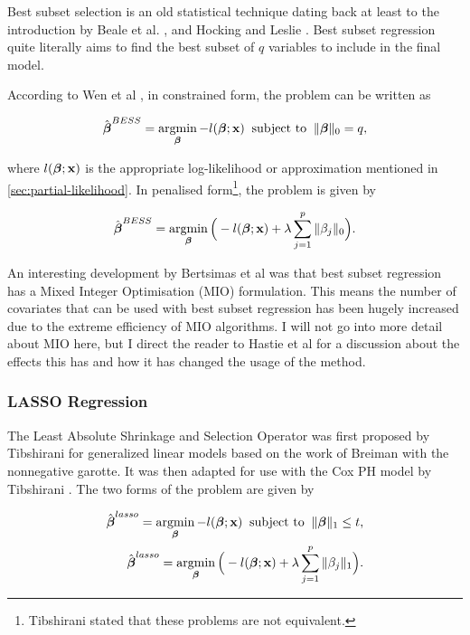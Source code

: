Best subset selection is an old statistical technique dating back at least to the introduction by Beale et al. , and Hocking and Leslie . Best subset regression quite literally aims to find the best subset of $q$ variables to include in the final model.

According to Wen et al , in constrained form, the problem can be written as

\begin{equation}
    \hat{\boldsymbol{\beta}}^{BESS}=\operatorname*{argmin}_{\boldsymbol{\beta}} -l(\boldsymbol{\beta};\textbf{x})\;\;\textrm{subject to}\;\;\Vert\boldsymbol{\beta}\Vert_0=q,
\end{equation}

where $l(\boldsymbol{\beta};\textbf{x})$ is the appropriate log-likelihood or approximation mentioned in \cref{sec:partial-likelihood}. In penalised form\footnote{Tibshirani  stated that these problems are not equivalent.}, the problem is given by

\begin{equation}
    \hat{\boldsymbol{\beta}}^{BESS} = \operatorname*{argmin}_{\boldsymbol{\beta}}\Big(-l(\boldsymbol{\beta};\textbf{x})+\lambda\sum_{j=1}^p\Vert\beta_j\Vert_0\Big).
\end{equation}

An interesting development by Bertsimas et al  was that best subset regression has a Mixed Integer Optimisation (MIO) formulation. This means the number of covariates that can be used with best subset regression has been hugely increased due to the extreme efficiency of MIO algorithms. I will not go into more detail about MIO here, but I direct the reader to Hastie et al  for a discussion about the effects this has and how it has changed the usage of the method.

\subsubsection{LASSO Regression}\label{sec:LASSO}

The Least Absolute Shrinkage and Selection Operator was first proposed by Tibshirani  for generalized linear models based on the work of Breiman  with the nonnegative garotte. It was then adapted for use with the Cox PH model by Tibshirani . The two forms of the problem are given by

\begin{align}
    \hat{\boldsymbol{\beta}}^{lasso} =\operatorname*{argmin}_{\boldsymbol{\beta}} -l(\boldsymbol{\beta};\textbf{x})\;\;\textrm{subject to}\;\;\Vert\boldsymbol{\beta}\Vert_1\leq t,\\
    \hat{\boldsymbol{\beta}}^{lasso} = \operatorname*{argmin}_{\boldsymbol{\beta}}\Big(-l(\boldsymbol{\beta};\textbf{x})+\lambda\sum_{j=1}^p\Vert\beta_j\Vert_1\Big).
\end{align}

